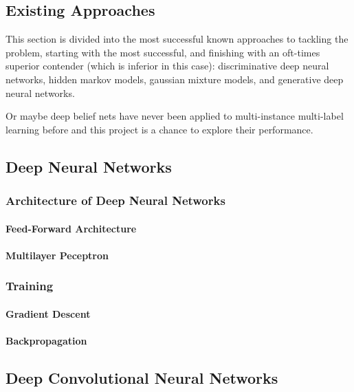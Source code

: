 \documentclass[a4paper,11pt]{article}
\begin{document}
\subsection{Existing Approaches}

This section is divided into the most successful known approaches to tackling the problem, starting with the most successful, and finishing with an oft-times superior contender (which is inferior in this case): discriminative deep neural networks, hidden markov models, gaussian mixture models, and generative deep neural networks. 

Or maybe deep belief nets have never been applied to multi-instance multi-label learning before and this project is a chance to explore their performance.

\subsection{Deep Neural Networks}

\subsubsection{Architecture of Deep Neural Networks}

\paragraph{Feed-Forward Architecture}

\paragraph{Multilayer Peceptron}

\subsubsection{Training}
\paragraph{Gradient Descent}
\paragraph{Backpropagation}

\pagebreak
\subsection{Deep Convolutional Neural Networks}
\end{document}
